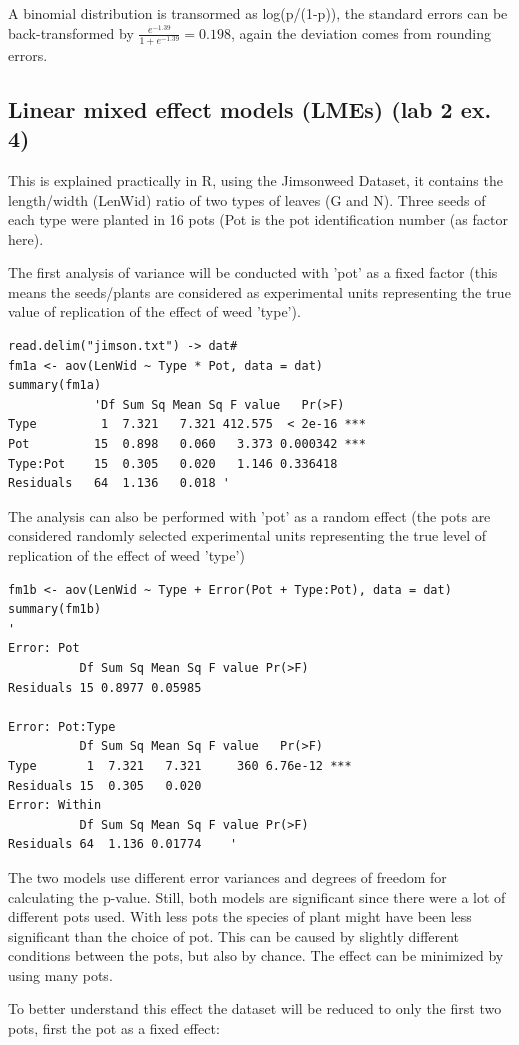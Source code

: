 \documentclass{article}
\begin{document}
A binomial distribution is transormed as log(p/(1-p)), the standard errors can be back-transformed by $\frac{e^{-1.39}}{1+e^{-1.39}} = 0.198$, again the deviation comes from rounding errors. 

\subsection{Linear mixed effect models (LMEs) (lab 2 ex. 4)}
This is explained practically in R, using the Jimsonweed Dataset, it contains the length/width (LenWid) ratio of two types of leaves (G and N). Three seeds of each type were planted in 16 pots (Pot is the pot identification number (as factor here).\par 
The first analysis of variance will be conducted with 'pot' as a fixed factor (this means the seeds/plants are considered as experimental units representing the true value of replication of the effect of weed 'type').

\begin{lstlisting}
read.delim("jimson.txt") -> dat#
fm1a <- aov(LenWid ~ Type * Pot, data = dat)
summary(fm1a)
            'Df Sum Sq Mean Sq F value   Pr(>F)    
Type         1  7.321   7.321 412.575  < 2e-16 ***
Pot         15  0.898   0.060   3.373 0.000342 ***
Type:Pot    15  0.305   0.020   1.146 0.336418    
Residuals   64  1.136   0.018 '
\end{lstlisting}

The analysis can also be performed with 'pot' as a random effect (the pots are considered randomly selected experimental units representing the true level of replication of the effect of weed 'type')

\begin{lstlisting}
fm1b <- aov(LenWid ~ Type + Error(Pot + Type:Pot), data = dat)
summary(fm1b)
'
Error: Pot
          Df Sum Sq Mean Sq F value Pr(>F)
Residuals 15 0.8977 0.05985               

Error: Pot:Type
          Df Sum Sq Mean Sq F value   Pr(>F)    
Type       1  7.321   7.321     360 6.76e-12 ***
Residuals 15  0.305   0.020                     
Error: Within
          Df Sum Sq Mean Sq F value Pr(>F)
Residuals 64  1.136 0.01774    '  
\end{lstlisting}

The two models use different error variances and degrees of freedom for calculating the p-value. Still, both models are significant since there were a lot of different pots used. With less pots the species of plant might have been less significant than the choice of pot. This can be caused by slightly different conditions between the pots, but also by chance. The effect can be minimized by using many pots.\par 
To better understand this effect the dataset will be reduced to only the first two pots, first the pot as a fixed effect:
\end{document}
